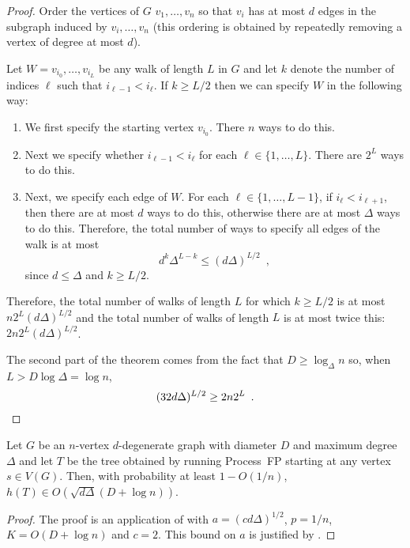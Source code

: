 \documentclass[lotsofwhite]{patmorin}
\begin{document}
\begin{proof}
   Order the vertices of $G$ $v_1,\ldots,v_n$ so that $v_i$ has at most
   $d$ edges in the subgraph induced by $v_i,\ldots,v_n$ (this ordering
   is obtained by repeatedly removing a vertex of degree at most $d$).

   Let $W=v_{i_0},\ldots,v_{i_L}$ be any walk of length $L$ in $G$ and
   let $k$ denote the number of indices $\ell$ such that $i_{\ell-1}
   < i_{\ell}$.  
   If $k\ge L/2$ then we can specify $W$ in the following way:
   \begin{enumerate}
     \item We first specify the starting vertex $v_{i_0}$.  There $n$
       ways to do this.
     \item Next we specify whether $i_{\ell-1} < i_{\ell}$ for each
       $\ell\in\{1,\ldots,L\}$.  There are $2^L$ ways to do this.
     \item Next, we specify each edge of $W$.  For each
       $\ell\in\{1,\ldots,L-1\}$, if $i_{\ell} < i_{\ell+1}$,
       then there are at most $d$ ways to do this, otherwise there are at most $\Delta$
       ways to do this.
      Therefore, the total number of ways to specify all edges of the walk
      is at most  
      \[   d^k\Delta^{L-k} \le (d\Delta)^{L/2}  \enspace ,\]
      since $d\le \Delta$ and $k\ge L/2$.
   \end{enumerate}
   Therefore, the total number of walks of length $L$ for which $k\ge
   L/2$ is at most $n2^L(d\Delta)^{L/2}$ and the total number of walks
   of length $L$ is at most twice this: $2n2^L(d\Delta)^{L/2}$.

   The second part of the theorem comes from the fact that $D\ge
   \log_\Delta n$ so, when $L>D\log\Delta=\log n$,
   \[ (32d\Delta)^{L/2} \ge 2n2^L \enspace . \qedhere \]
\end{proof}

\begin{thm}
  Let $G$ be an $n$-vertex $d$-degenerate graph with diameter $D$ and
  maximum degree $\Delta$ and let $T$ be the tree obtained
  by running Process~FP starting at any vertex $s\in V(G)$.  Then,
  with probability at least $1-O(1/n)$, $h(T)\in O(\sqrt{d\Delta}(D+\log n))$.
\end{thm}

\begin{proof}
  The proof is an application of  with
  $a=(cd\Delta)^{1/2}$, $p=1/n$, $K=O(D+\log n)$ and $c=2$. This bound
  on $a$ is justified by .
\end{proof}
\end{document}
